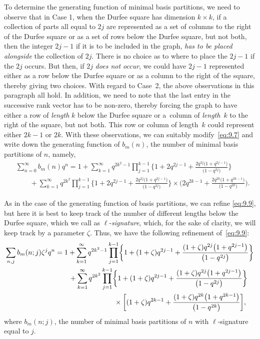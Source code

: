 \documentclass[10pt,a4paper]{amsart}
\numberwithin{equation}{section}
\theoremstyle{definition}
\begin{document}
To determine the generating function of minimal basis partitions, we need
to observe that in Case 1, when the Durfee square has dimension $k\times k$, if a collection
of parts all equal to $2j$ are represented as a set of columns to the
right of the Durfee square or as a set of rows below the Durfee square,
but not both, then the integer $2j-1$ if it is to be included in the graph,
\textit{has to be placed alongside} the collection of $2j$. There is no choice as to
where to place the $2j-1$ if the $2j$ occurs. But then, if $2j$ \textit{does not occur},
we could have $2j-1$ represented either as a row below the Durfee square or
as a column to the right of the square, thereby giving two choices. With
regard to Case~2, the above observations in this paragraph all hold. In
addition, we need to note that the last entry in the successive rank vector
has to be non-zero, thereby forcing the graph to have either a row of
{\it length} $k$ below the Durfee square or a~column of {\it length}~$k$
to the right of the square, but not both. This row or column of length~$k$
could represent either $2k-1$ or $2k$. With these observations, we can
suitably modify~\eqref{eq:9.7} and write down the generating function of $b_m(n)$,
the number of minimal basis partitions of $n$, namely,
\begin{align}
&\sum^{\infty}_{n=0}b_m(n)q^n=1+ \sum^{\infty}_{k=1}q^{2k^2-1}\prod^{k-1}_{j=1}
\biggl\{1+2q^{2j-1}+\frac{2q^{2j}\bigl(1+q^{2j-1}\bigr)}{\bigl(1-q^{2j}\bigr)}\biggr\}
\nonumber\\
&\qquad{}+ \sum^{\infty}_{k=1}q^{2k^2}\prod^{k-1}_{j=1}
\biggl\{1+2q^{2j-1}+\frac{2q^{2j}\bigl(1+q^{2j-1}\bigr)}{\bigl(1-q^{2j}\bigr)}\biggr\}
\times
\biggl(2q^{2k-1}+\frac{2q^{2k}\bigl(1+q^{2k-1}\bigr)}{\bigl(1-q^{2k}\bigr)}\biggr).\label{eq:9.9}
\end{align}

As in the case of the generating function of basis partitions, we can refine
\eqref{eq:9.9}, but here it is best to keep track of the number of different lengths
below the Durfee square, which we call as $\ell$-{\it signature}, which,
for the sake of clarity, we will keep track by a parameter $\zeta$. Thus, we
have the following refinement of~\eqref{eq:9.9}:
\begin{gather}
\sum_{n,j}b_m(n;j){\zeta}^jq^n=1+ \sum^{\infty}_{k=1}q^{2k^2-1}\prod^{k-1}_{j=1}
\biggl\{1+(1+\zeta)q^{2j-1}+\frac{(1+\zeta)q^{2j}\bigl(1+q^{2j-1}\bigr)}{\bigl(1-q^{2j}\bigr)}\biggr\}
\nonumber\\
\hphantom{\sum_{n,j}b_m(n;j){\zeta}^jq^n=}{}
+\sum^{\infty}_{k=1}q^{2k^2}\prod^{k-1}_{j=1}
\biggl\{1+(1+\zeta)q^{2j-1}+\frac{(1+\zeta)q^{2j}\bigl(1+q^{2j-1}\bigr)}{\bigl(1-q^{2j}\bigr)}\biggr\}\nonumber\\
\hphantom{\sum_{n,j}b_m(n;j){\zeta}^jq^n=+\sum^{\infty}_{k=1}q^{2k^2}\prod^{k-1}_{j=1}}{}
\times
\biggl[(1+\zeta)q^{2k-1}+\frac{(1+\zeta)q^{2k}\bigl(1+q^{2k-1}\bigr)}{\bigl(1-q^{2k}\bigr)}\biggr],\label{eq:9.10}
\end{gather}
where $b_m(n;j)$, the number of minimal basis partitions
of $n$ with $\ell$-signature equal to $j$.
\end{document}
